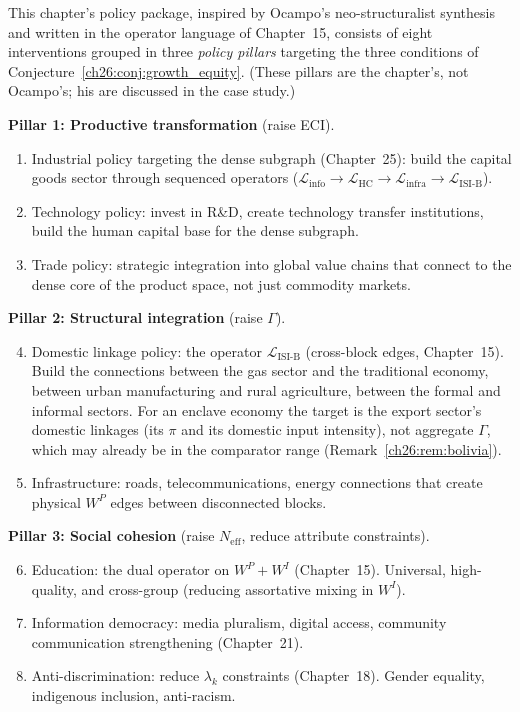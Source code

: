 \documentclass[../structural_economics_book.tex]{subfiles}
\begin{document}
\begin{definition}\label{ch26:def:package}
This chapter's policy package, inspired by Ocampo's neo-structuralist synthesis and written in the operator language of Chapter~15, consists of eight interventions grouped in three \emph{policy pillars} targeting the three conditions of Conjecture~\ref{ch26:conj:growth_equity}. (These pillars are the chapter's, not Ocampo's; his are discussed in the case study.)

\textbf{Pillar 1: Productive transformation} (raise ECI).
\begin{enumerate}
\item Industrial policy targeting the dense subgraph (Chapter~25): build the capital goods sector through sequenced operators ($\mathcal{L}_{\text{info}} \to \mathcal{L}_{\text{HC}} \to \mathcal{L}_{\text{infra}} \to \mathcal{L}_{\text{ISI-B}}$).
\item Technology policy: invest in R\&D, create technology transfer institutions, build the human capital base for the dense subgraph.
\item Trade policy: strategic integration into global value chains that connect to the dense core of the product space, not just commodity markets.
\end{enumerate}

\textbf{Pillar 2: Structural integration} (raise $\Gamma$).
\begin{enumerate}
\setcounter{enumi}{3}
\item Domestic linkage policy: the operator $\mathcal{L}_{\text{ISI-B}}$ (cross-block edges, Chapter~15). Build the connections between the gas sector and the traditional economy, between urban manufacturing and rural agriculture, between the formal and informal sectors. For an enclave economy the target is the export sector's domestic linkages (its $\pi$ and its domestic input intensity), not aggregate $\Gamma$, which may already be in the comparator range (Remark~\ref{ch26:rem:bolivia}).
\item Infrastructure: roads, telecommunications, energy connections that create physical $W^P$ edges between disconnected blocks.
\end{enumerate}

\textbf{Pillar 3: Social cohesion} (raise $N_{\text{eff}}$, reduce attribute constraints).
\begin{enumerate}
\setcounter{enumi}{5}
\item Education: the dual operator on $W^P + W^I$ (Chapter~15). Universal, high-quality, and cross-group (reducing assortative mixing in $W^I$).
\item Information democracy: media pluralism, digital access, community communication strengthening (Chapter~21).
\item Anti-discrimination: reduce $\lambda_k$ constraints (Chapter~18). Gender equality, indigenous inclusion, anti-racism.
\end{enumerate}
\end{definition}
\end{document}
